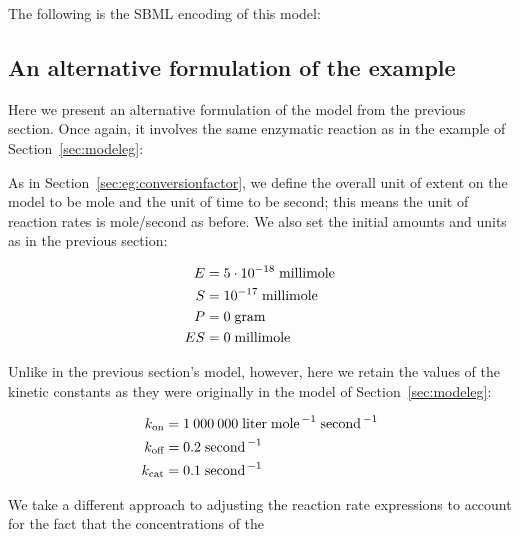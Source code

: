 The following is the SBML encoding of this model:



\subsection{An alternative formulation of the  example}
\label{sec:eg:conversionfactor2}

Here we present an alternative formulation of the model from the
previous section.  Once again, it involves the same enzymatic
reaction as in the example of Section~\ref{sec:modeleg}:
\begin{center}
\end{center}
As in Section~\ref{sec:eg:conversionfactor}, we define the overall
unit of extent on the model to be \unit{mole} and the unit of time
to be \unit{second}; this means the unit of reaction rates is
\unit{mole}/\unit{second} as before.  We also set the initial
amounts and units as in the previous section:
\begin{linenomath}
  \begin{align*}
    E   & = 5 \cdot 10^{-18} \; \text{millimole} \\
    S   & = 10^{-17} \; \text{millimole} \\
    P   & = 0 \; \text{gram} \\
    ES  & = 0 \; \text{millimole}
  \end{align*}
\end{linenomath}
Unlike in the previous section's model, however, here we retain
the values of the kinetic constants as they were originally in the
model of Section~\ref{sec:modeleg}:
\begin{linenomath}
  \begin{align*}
    k_\text{on}  & = 1\:000\:000 \; \text{liter} \; \text{mole}^{\,-1} \; \text{second}^{\,-1}\\
    k_\text{off} & = 0.2 \; \text{second}^{\,-1}\\
    k_\text{cat} & = 0.1 \; \text{second}^{\,-1}
  \end{align*}
\end{linenomath}
We take a different approach to adjusting the reaction rate
expressions to account for the fact that the concentrations of the
